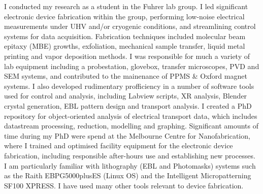 \documentclass[10pt,a4paper,ragged2e,withhyper]{altacv}
\begin{document}
		{\textalignment
		I conducted my research as a student in the Fuhrer lab group. I led significant electronic device fabrication within the group, performing low-noise electrical measurements under UHV and/or cryogenic conditions, and streamlining control systems for data acquisition. Fabrication techniques included molecular beam epitaxy (MBE) growths, exfoliation, mechanical sample transfer, liquid metal printing and vapor deposition methods. 
		I was responsible for much a variety of lab equipment including a probestation, glovebox, transfer microscopes, PVD and SEM systems, and contributed to the mainenance of PPMS \& Oxford magnet systems.
		I also developed rudimentary profficiency in a number of software tools used for control and analysis, including Labview scripts, XR analysis, Blender crystal generation, EBL pattern design and transport analysis. I created a PhD repository for object-oriented analysis of electrical transport data, which includes datastream processing, reduction, modelling and graphing. Significant amounts of time during my PhD were spend at the Melbourne Centre for Nanofabrication, where I trained and optimised facility equipment for the electronic device fabrication, including responsible after-hours use and establishing new processes. 
		I am particularly familiar with lithography (EBL and Photomasks) systems such as the Raith EBPG5000plusES (Linux OS) and the Intelligent Micropatterning SF100 XPRESS. I have used many other tools relevant to device fabrication.
		}
\end{document}
